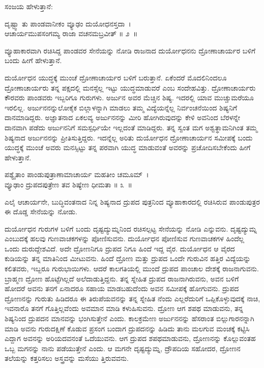 ಸಂಜಯ ಹೇಳುತ್ತಾನೆ:

\begin{shloka}
ದೃಷ್ಟ್ವಾ ತು ಪಾಂಡವಾನೀಕಂ ವ್ಯೂಢಂ ದುಯೋಧನಸ್ತದಾ~।\\ಆಚಾರ್ಯಮುಪಸಂಗಮ್ಯ ರಾಜಾ ವಚನಮಬ್ರವೀತ್ \hfill॥ ೨~॥
\end{shloka}

\begin{artha}
ವ್ಯೂಹಾಕಾರವಾಗಿ ರಚಿಸಿದ್ದ ಪಾಂಡವರ ಸೇನೆಯನ್ನು ನೋಡಿ ರಾಜನಾದ ದುರ್ಯೋಧನನು ದ್ರೋಣಾಚಾರ್ಯರ ಬಳಿಗೆ ಬಂದು ಹೀಗೆ ಹೇಳುತ್ತಾನೆ.
\end{artha}

ದುರ್ಯೋಧನ ಯುದ್ಧಕ್ಕೆ ಮುಂಚೆ ದ್ರೋಣಾಚಾರ್ಯರ ಬಳಿಗೆ ಬರುತ್ತಾನೆ. ಏಕೆಂದರೆ ಮೊದಲಿನಿಂದಲೂ ದ್ರೋಣಾಚಾರ್ಯರು ತನ್ನ ಪಕ್ಷದಲ್ಲಿ ಮನಸ್ಸೆಲ್ಲ ಇಟ್ಟು ಯುದ್ಧಮಾಡುವರೆ ಎಂಬ ಸಂದೇಹವಿತ್ತು. ದ್ರೋಣಾಚಾರ್ಯರು ಕೌರವರು ಪಾಂಡವರು ಇಬ್ಬರಿಗೂ ಗುರುಗಳು. ಅರ್ಜುನ ಅವರ ಮೆಚ್ಚಿನ ಶಿಷ್ಯ. ಇದರಲ್ಲಿ ಯಾವ ಮುಚ್ಚುಮರೆಯೂ ಇರಲಿಲ್ಲ. ಅರ್ಜುನನನ್ನು\break ಲೋಕೈಕ ಬಿಲ್ಲಾಳನ್ನಾಗಿ ಮಾಡಲು ತಮ್ಮ ವಿದ್ಯೆಯನ್ನೆಲ್ಲ ನಿರ್ವಂಚನೆಯಿಂದ ಶಿಷ್ಯನಿಗೆ ದಾನ\-ಮಾಡಿದ್ದರು. ಅಜ್ಞಾತನಾದ ಏಕಲವ್ಯ ಅರ್ಜುನನನ್ನು ಮೀರಿ ಹೋಗಿರುವುದನ್ನು ಕೇಳಿ ಅವನಿಂದ ಬೆರಳನ್ನೇ ದಾನವಾಗಿ ಪಡೆದು ಅರ್ಜುನನಿಗೆ ಸಮಸ್ಪರ್ಧಿಯೇ ಇಲ್ಲದಂತೆ ಮಾಡಿದ್ದರು. ತನ್ನ ಸ್ವಂತ ಮಗ ಅಶ್ವತ್ಥಾಮನಿಗಿಂತ ತಮ್ಮ ಶಿಷ್ಯನಾದ ಅರ್ಜುನನನ್ನು ಪ್ರೀತಿಸುತ್ತಿದ್ದರು. ಇದನ್ನೆಲ್ಲ ಅರಿತು ದುರ್ಯೋಧನ ದ್ರೋಣಾಚಾರ್ಯನ ಸಮೀಪಕ್ಕೆ ಬಂದು ಯುದ್ಧಕ್ಕೆ ಮುಂಚೆ ಅವರು ಮನಸ್ಸಿಟ್ಟು ತನ್ನ ಪರವಾಗಿ ಯುದ್ಧ ಮಾಡುವಂತೆ ಅವರನ್ನು ಪ್ರಚೋದಿಸಬೇಕೆಂದು ಹೀಗೆ ಹೇಳುತ್ತಾನೆ.

\begin{shloka}
ಪಶ್ಯೈತಾಂ ಪಾಂಡುಪುತ್ರಾಣಾಮಾಚಾರ್ಯ ಮಹತೀಂ ಚಮೂಮ್~।\\ವ್ಯೂಢಾಂ ದ್ರುಪದಪುತ್ರೇಣ ತವ ಶಿಷ್ಯೇಣ ಧೀಮತಾ \hfill॥ ೩~॥
\end{shloka}

\begin{artha}
ಎಲೈ ಆಚಾರ್ಯನೇ, ಬುದ್ಧಿವಂತನಾದ ನಿನ್ನ ಶಿಷ್ಯನಾದ ದ್ರುಪದ ಪುತ್ರನಿಂದ ವ್ಯೂಹಾಕಾರದಲ್ಲಿ ರಚಿಸಿರುವ ಪಾಂಡುಪುತ್ರರ ಈ ದೊಡ್ಡ ಸೇನೆಯನ್ನು ನೋಡು.
\end{artha}

ದುರ್ಯೋಧನ ಗುರುಗಳ ಬಳಿಗೆ ಬಂದು ದೃಷ್ಟದ್ಯುಮ್ನನಿಂದ ರಚಿಸಲ್ಪಟ್ಟ ಸೇನೆಯನ್ನು ನೋಡಿ ಎನ್ನುವನು. ದೃಷ್ಟದ್ಯುಮ್ನ ಎಂಬುದಕ್ಕೆ ಹಲವು ಗುಣವಾಚಕಗಳನ್ನು ಪೋಣಿಸುವನು. ದುರ್ಯೋಧನ ಪೋಣಿಸುವ ಗುಣವಾಚಕಗಳ ಹಿಂದೆಲ್ಲ ಒಂದು ದುರುದ್ದೇಶವಿದೆ. ಅದೇ ದ್ರೋಣನಿಗೂ ದ್ರುಪದ ನಿಗೂ ಹಿಂದೆ ಇದ್ದ ವೈರ. ದುರ್ಯೋಧನ ಆ ವೈರದ ಕುಡಿಯನ್ನು ತನ್ನ ಮಾತಿನಿಂದ ಮೀಟುವನು. ಹಿಂದೆ ದ್ರೋಣ ಮತ್ತು ದ್ರುಪದ ಒಂದೇ ಗುರುವಿನ ಹತ್ತಿರ ವಿದ್ಯೆಯನ್ನು ಕಲಿತವರು, ಇಬ್ಬರೂ ಗುರುಭಾಯಿಗಳು. ಆದರೆ ಕಾಲಗತಿಯಲ್ಲಿ ಮುಂದೆ ದ್ರುಪದ ಪಾಂಚಾಲ ದೇಶಕ್ಕೆ ರಾಜನಾಗುವನು. ಬ್ರಾಹ್ಮಣ ದ್ರೋಣ ಹೊಟ್ಟೆಗಿಲ್ಲದೆ ಅಲೆದಾಡುತ್ತಿದ್ದನು. ತನ್ನ ಸ್ನೇಹಿತ ದ್ರುಪದ ರಾಜನಾಗಿರುವನು, ಅವನ ಬಳಿಗೆ ಹೋದರೆ ಅವನು ತನಗೆ ಏನಾದರೂ ಸಹಾಯ ಮಾಡಬಹುದೆಂದು ಅವನ ಸಮೀಪಕ್ಕೆ ಹೋಗುವನು. ದ್ರುಪದ ದ್ರೋಣನನ್ನು ಗುರುತು ಹಿಡಿದರೂ ಈ ತಿರುಪೆಯವನನ್ನು ತನ್ನ ಸ್ನೇಹಿತ ನೆಂದು ಎಲ್ಲರೆದುರಿಗೆ ಒಪ್ಪಿಕೊಳ್ಳುವುದಕ್ಕೆ ನಾಚಿ, ಇವನಾರೊ ತನಗೆ ಗೊತ್ತಿಲ್ಲವೆಂದು ಅವಮಾನ ಮಾಡಿ ಕಳುಹಿಸುವನು. ದ್ರೋಣ ಆಗ ಶಪಥ ಮಾಡುವನು, ತನ್ನ ಶಿಷ್ಯನಿಂದ ದ್ರುಪದನ ಮಾನವನ್ನು ಭಂಗಿಸುತ್ತೇನೆ ಎಂದು. ಕಾಲಕ್ರಮೇಣ ಅರ್ಜುನನನ್ನು ಹೆಸರಾಂತ ಬಿಲ್ಲುಗಾರನನ್ನಾಗಿ ಮಾಡಿ ಅವನು ಗುರುದಕ್ಷಿಣೆ ಕೊಡುವ ಪ್ರಸಂಗ ಬಂದಾಗ ದ್ರುಪದನನ್ನು ಹಿಡಿದು ತಾನು ಮಲಗುವ ಮಂಚಕ್ಕೆ ಕಟ್ಟಿಸಿ ಎದ್ದಾಗ ಅವನನ್ನು ಅರಿಯದವನಂತೆ ಒದೆಯುವನು. ಆಗ ದ್ರುಪದ ಶಪಥಮಾಡುವನು, ದ್ರೋಣನನ್ನು ಕೊಲ್ಲುವಂತಹ ಒಬ್ಬ ಮಗನನ್ನು ನಾನು ಪಡೆಯುತ್ತೇನೆ ಎಂದು. ಆ ಮಗನೇ ದೃಷ್ಟದ್ಯುಮ್ನ, ದ್ರೌಪದಿಯ ಸಹೋದರ, ದ್ರೋಣನ ತಲೆಯನ್ನು ಕತ್ತರಿಸಲು ಅಸ್ತ್ರವನ್ನು ಮಸೆಯು ತ್ತಿರುವವನು.

